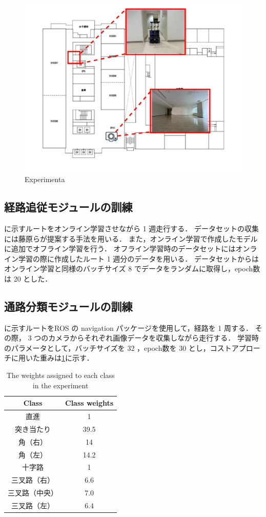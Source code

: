 \begin{figure}
  \centering
  \includegraphics[width=130mm]{images/pdf/ishiguro/keepout.pdf}
  \caption{Experimenta}
  \label{fig:keepout}
\end{figure}

\clearpage
\subsection{経路追従モジュールの訓練}
に示すルートをオンライン学習させながら 1 週走行する．
データセットの収集には藤原ら\cite{fujiwara2023}が提案する手法を用いる．
また，オンライン学習で作成したモデルに追加でオフライン学習を行う．
オフライン学習時のデータセットにはオンライン学習の際に作成したルート 1 週分のデータを用いる．
データセットからはオンライン学習と同様のバッチサイズ 8 でデータをランダムに取得し，epoch数は 20 とした．

\subsection{通路分類モジュールの訓練}
に示すルートをROS の navigation パッケージを使用して，経路を 1 周する．
その際， 3 つのカメラからそれぞれ画像データを収集しながら走行する．
学習時のパラメータとして，バッチサイズを 32 ，epoch数を 30 とし，コストアプローチに用いた重みは\ref{tab:cost}に示す．

\begin{table}[htbp]
  \centering
  \caption{The weights assigned to each class in the experiment}\label{tab:cost}
  \begin{tabular}{c|c}
  \hline
  Class & Class weights\\
  \hline
  直進   & 1\\
  突き当たり   & 39.5\\
  角（右） & 14\\
  角（左）& 14.2 \\
  十字路 & 1  \\
  三叉路（右）& 6.6  \\
  三叉路（中央）& 7.0  \\
  三叉路（左） & 6.4  \\
  \hline
  \end{tabular}
\end{table}

